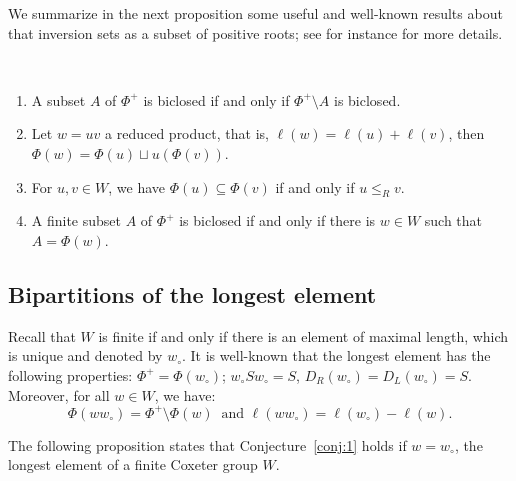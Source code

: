 \documentclass[ALCO,Unicode]{cedram}
\theoremstyle{definition}
\begin{document}
We summarize in the next proposition some useful and well-known results about that inversion sets as a subset of positive roots; see for instance \cite[\S2.2-2.3]{HoLa16} for more details.

\begin{prop}\label{prop:Biclos}\
\begin{enumerate}
\item A subset $A$ of $\Phi^+$ is biclosed if and only if $\Phi^+\setminus A$ is biclosed. 
\item Let $w=uv$ a reduced product, that is, $\ell(w)=\ell(u)+\ell(v)$, then $\Phi(w)=\Phi(u)\sqcup u(\Phi(v))$.
\item For $u,v\in W$, we have $\Phi(u)\subseteq \Phi(v)$ if and only if $u\leq_R v$. 
\item A finite subset $A$ of $\Phi^+$ is biclosed if and only if there is $w\in W$ such that $A=\Phi(w)$.
\end{enumerate}
\end{prop}


\subsection{Bipartitions of the longest element} Recall that $W$ is finite if and only if there is an element of maximal length, which is unique and denoted by $w_\circ$. It is well-known that the longest element has the following properties: $\Phi^+=\Phi(w_\circ)$; $w_\circ Sw_\circ = S$, $D_R(w_\circ)=D_L(w_\circ)=S$. Moreover,  for all $w\in W$, we have:
$$
\Phi(ww_\circ)=\Phi^+\setminus \Phi(w)\ \textrm{ and } \ell(ww_\circ)=\ell(w_\circ) - \ell(w).
$$ 

The following proposition states that Conjecture~\ref{conj:1} holds if $w=w_\circ$, the longest element of a finite Coxeter group $W$.
\end{document}
